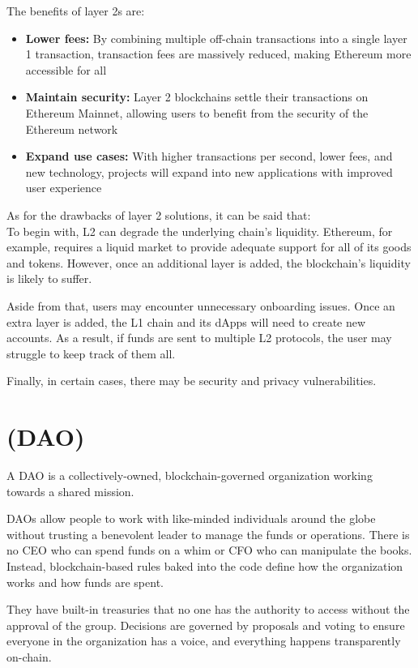 \documentclass[MSE,Master,english]{twbook}%
\begin{document}
The benefits of layer 2s are:
\begin{itemize}
  \item \textbf{Lower fees:} By combining multiple off-chain transactions into a single layer 1 transaction, transaction fees are massively reduced, making Ethereum more accessible for all
  \item \textbf{Maintain security:} Layer 2 blockchains settle their transactions on Ethereum Mainnet, allowing users to benefit from the security of the Ethereum network
  \item \textbf{Expand use cases:} With higher transactions per second, lower fees, and new technology, projects will expand into new applications with improved user experience
\end{itemize}

As for the drawbacks of layer 2 solutions, it can be said that: \\

To begin with, L2 can degrade the underlying chain's liquidity.\cite{l2Drawbacks} Ethereum, for example, requires a liquid market to provide adequate support for all of its goods and tokens. However, once an additional layer is added, the blockchain's liquidity is likely to suffer.

Aside from that, users may encounter unnecessary onboarding issues. Once an extra layer is added, the L1 chain and its dApps will need to create new accounts. As a result, if funds are sent to multiple L2 protocols, the user may struggle to keep track of them all.

Finally, in certain cases, there may be security and privacy vulnerabilities.

\section{ (DAO)}
A DAO\cite{DAO} is a collectively-owned, blockchain-governed organization working towards a shared mission.

DAOs allow people to work with like-minded individuals around the globe\cite{DAO} without trusting a benevolent leader to manage the funds or operations. There is no CEO who can spend funds on a whim or CFO who can manipulate the books. Instead, blockchain-based rules baked into the code define how the organization works and how funds are spent.

They have built-in treasuries that no one has the authority to access without the approval of the group. Decisions are governed by proposals and voting to ensure everyone in the organization has a voice, and everything happens transparently on-chain.\cite{DAO} \\
\end{document}
